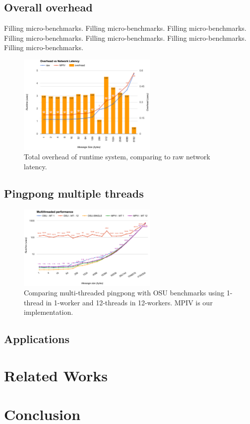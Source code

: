 \documentclass{sig-alternate-05-2015}
\begin{document}
\subsection{Overall overhead}
Filling micro-benchmarks.
Filling micro-benchmarks.
Filling micro-benchmarks.
Filling micro-benchmarks.
Filling micro-benchmarks.
Filling micro-benchmarks.
Filling micro-benchmarks.
\begin{figure}[h!]
  \centering 
  \includegraphics[width=0.6\textwidth]{fig/overhead.png}
  \caption{Total overhead of runtime system, comparing to raw network latency.}
\end{figure}

\subsection{Pingpong multiple threads}
\begin{figure}[h!]
  \centering 
  \includegraphics[width=0.6\textwidth]{fig/pingpong.png}
  \caption{Comparing multi-threaded pingpong with OSU benchmarks using 1-thread
  in 1-worker and 12-threads in 12-workers. MPIV is our implementation.}
\end{figure}

\subsection{Applications}
\section{Related Works}
\section{Conclusion}
\end{document}
